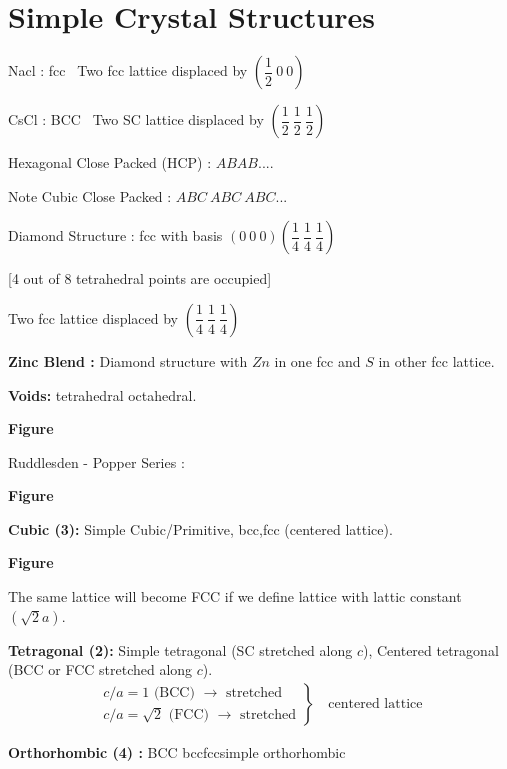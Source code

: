 \chapter{Simple Crystal Structures}\label{chap4}

Nacl : fcc \ Two fcc lattice displaced by $\left(\dfrac{1}{2} \ 0 \ 0\right)$

CsCl : BCC \ Two SC lattice displaced by $\left(\dfrac{1}{2} \ \dfrac{1}{2} \ \dfrac{1}{2}\right)$

Hexagonal Close Packed (HCP) : $ABAB....$

Note Cubic Close Packed : $ABC \ ABC \ ABC...$

Diamond Structure : fcc with basis $(0 \ 0 \ 0) \left(\dfrac{1}{4} \ \dfrac{1}{4} \ \dfrac{1}{4}\right)$

[4 out of 8 tetrahedral points are occupied]

Two fcc lattice displaced by $\left(\dfrac{1}{4} \ \dfrac{1}{4} \ \dfrac{1}{4}\right)$

\noindent
{\bf Zinc Blend :} Diamond structure with $Zn$ in one fcc and $S$ in other fcc lattice.

\noindent
{\bf Voids:} tetrahedral octahedral.

\begin{center}
{\bf Figure}
\end{center}

Ruddlesden - Popper Series :
\begin{center}
{\bf Figure}
\end{center}

\noindent
\textbf{Cubic (3):} Simple Cubic/Primitive, bcc,fcc (centered lattice).
\begin{center}
{\bf Figure}
\end{center}

The same lattice will become FCC if we define lattice with lattic constant $(\sqrt{2}a)$.

\noindent
\textbf{Tetragonal (2):} Simple tetragonal (SC stretched along $c$), Centered tetragonal (BCC or FCC stretched along $c$).
\begin{align*}
\left.
\begin{array}{l}
c/a=1 \text{ (BCC) } \to \text{ stretched}\\
c/a=\sqrt{2} \text{ (FCC) } \to \text{ stretched}
\end{array}\right\}
\quad\text{centered lattice}
\end{align*}

\noindent
{\bf Orthorhombic (4) :} BCC \quad bcc\quad fcc\quad simple orthorhombic

